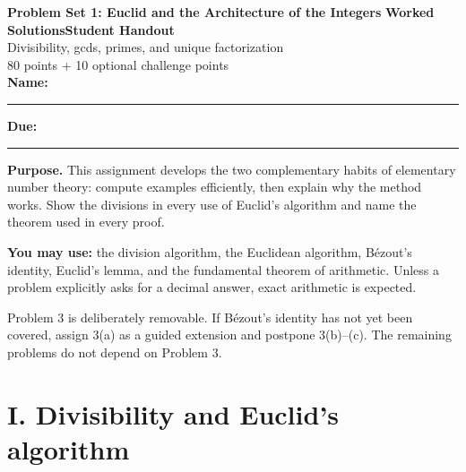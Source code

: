 \documentclass[11pt]{article}
\newcommand{\edition}{\ifsolutions Worked Solutions\else Student Handout\fi}
\begin{document}
\begin{tcolorbox}[
  enhanced,colback=paper,colframe=navy,boxrule=1.1pt,arc=2mm,
  left=5mm,right=5mm,top=3.5mm,bottom=3.5mm,
  borderline west={5pt}{0pt}{teal}]
  {\Large\bfseries\color{navy}Problem Set 1: Euclid and the Architecture of the Integers}
  \hfill{\bfseries\color{teal}\edition}\\[3pt]
  {\large Divisibility, gcds, primes, and unique factorization}\\[4pt]
  {\small\color{muted}80 points + 10 optional challenge points}
  \ifsolutions\else
    \\[7pt]\textbf{Name:}\ \rule{0.46\linewidth}{0.4pt}\hfill
    \textbf{Due:}\ \rule{0.21\linewidth}{0.4pt}
  \fi
\end{tcolorbox}

\begin{overviewbox}
\textbf{Purpose.} This assignment develops the two complementary habits of
elementary number theory: compute examples efficiently, then explain why the
method works. Show the divisions in every use of Euclid's algorithm and name
the theorem used in every proof.

\textbf{You may use:} the division algorithm, the Euclidean algorithm,
B\'ezout's identity, Euclid's lemma, and the fundamental theorem of arithmetic.
Unless a problem explicitly asks for a decimal answer, exact arithmetic is expected.
\end{overviewbox}

\ifsolutions
\begin{instructornote}
Problem 3 is deliberately removable. If B\'ezout's identity has not yet been
covered, assign 3(a) as a guided extension and postpone 3(b)--(c). The remaining
problems do not depend on Problem 3.
\end{instructornote}
\fi

\section*{I. Divisibility and Euclid's algorithm}
\end{document}
